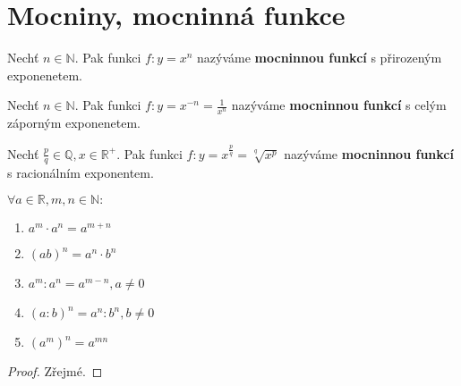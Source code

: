 \section{Mocniny, mocninná funkce}
\begin{definition}
    Nechť $n\in \mathbb N.$ Pak funkci $f: y=x^n$ nazýváme \textbf{mocninnou funkcí}
    s přirozeným exponenetem.
\end{definition}

\begin{definition}
    Nechť $n\in \mathbb N.$ Pak funkci $f: y=x^{-n}=\frac{1}{x^n}$ nazýváme
    \textbf{mocninnou funkcí} s celým záporným exponenetem.
\end{definition}

\begin{definition}
    Nechť $\frac{p}{q}\in \mathbb Q, x \in \mathbb R^+.$ Pak funkci $f: y=
    x^{\frac{p}{q}}=\sqrt[q]{x^p}$ nazýváme \textbf{mocninnou funkcí}
    s racionálním exponentem.
\end{definition}

\begin{veta}
    $\forall a \in \mathbb R, m,n \in \mathbb N:$
    \begin{enumerate}[$i.$]
        \item $a^m\cdot a^n=a^{m+n}$
       	\item $(ab)^n = a^n\cdot b^n$
       	\item $a^m : a^n = a^{m-n}, a \ne 0$
       	\item $(a : b)^n = a^n : b^n, b \ne 0$
       	\item $\left ( a^m \right )^n = a^{mn}$
    \end{enumerate}
\end{veta}

\begin{proof}
    Zřejmé.
\end{proof}

